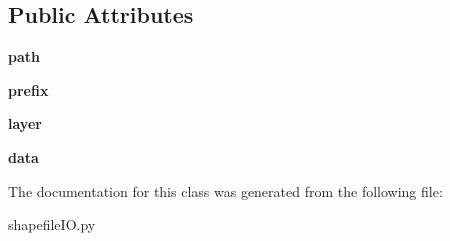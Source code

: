 \subsection*{Public Attributes}
\begin{DoxyCompactItemize}
\item 
\hypertarget{class_sim_g_d_c_1_1shapefile_i_o_1_1_shapefile_reader_afc7c5d2dcabc49ec05431c069872dc25}{}{\bfseries path}\label{class_sim_g_d_c_1_1shapefile_i_o_1_1_shapefile_reader_afc7c5d2dcabc49ec05431c069872dc25}

\item 
\hypertarget{class_sim_g_d_c_1_1shapefile_i_o_1_1_shapefile_reader_a39a239ebe8e9515d3e840763276b0757}{}{\bfseries prefix}\label{class_sim_g_d_c_1_1shapefile_i_o_1_1_shapefile_reader_a39a239ebe8e9515d3e840763276b0757}

\item 
\hypertarget{class_sim_g_d_c_1_1shapefile_i_o_1_1_shapefile_reader_a06978d3e54e8cc53a881238c41653ca9}{}{\bfseries layer}\label{class_sim_g_d_c_1_1shapefile_i_o_1_1_shapefile_reader_a06978d3e54e8cc53a881238c41653ca9}

\item 
\hypertarget{class_sim_g_d_c_1_1shapefile_i_o_1_1_shapefile_reader_af5bc9055f89c0b8510609213039016b9}{}{\bfseries data}\label{class_sim_g_d_c_1_1shapefile_i_o_1_1_shapefile_reader_af5bc9055f89c0b8510609213039016b9}

\end{DoxyCompactItemize}


The documentation for this class was generated from the following file\+:\begin{DoxyCompactItemize}
\item 
shapefile\+I\+O.\+py\end{DoxyCompactItemize}

